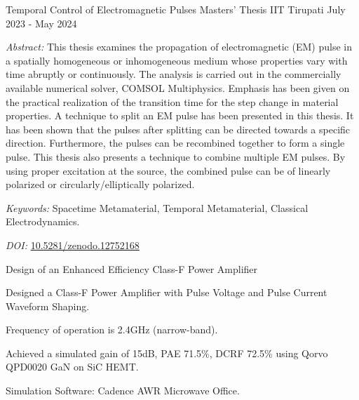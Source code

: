 


\begin{cventries}
    \cventry
      {Temporal Control of Electromagnetic Pulses} %
      {Masters' Thesis} %
      {IIT Tirupati} %
      {July 2023 - May 2024} %
      {
        \begin{cvitems} %
            \item{\textit{Abstract:} This thesis examines the propagation of electromagnetic (EM) pulse in a spatially homogeneous or inhomogeneous medium whose properties vary with time abruptly or continuously. The analysis is carried out in the commercially available numerical solver, COMSOL Multiphysics\textsuperscript{\textregistered}. Emphasis has been given on the practical realization of the transition time for the step change in material properties. A technique to split an EM pulse has been presented in this thesis. It has been shown that the pulses after splitting can be directed towards a specific direction. Furthermore, the pulses can be recombined together to form a single pulse. This thesis also presents a technique to combine multiple EM pulses. By using proper excitation at the source, the combined pulse can be of linearly polarized or circularly/elliptically polarized.}
          \item {\textit{Keywords:} Spacetime Metamaterial, Temporal Metamaterial, Classical Electrodynamics.}
          \item{\textit{DOI:} \href{https://zenodo.org/records/12752168}{10.5281/zenodo.12752168}}
        \end{cvitems}
      }
  

\begin{cventries}
  \cventry
    {Design of an Enhanced Efficiency Class-F Power Amplifier} %
    {} %
    {} %
    {} %
    {
      \begin{cvitems} %
        \item {Designed a Class-F Power Amplifier with Pulse Voltage and Pulse Current Waveform Shaping.}
        \item {Frequency of operation is 2.4GHz (narrow-band).}
        \item {Achieved a simulated gain of 15dB, PAE 71.5\%, DCRF 72.5\% using Qorvo QPD0020 GaN on SiC HEMT.}
        \item {Simulation Software: Cadence AWR Microwave Office.}
      \end{cvitems}
    }


\end{cventries}
\end{cventries}
